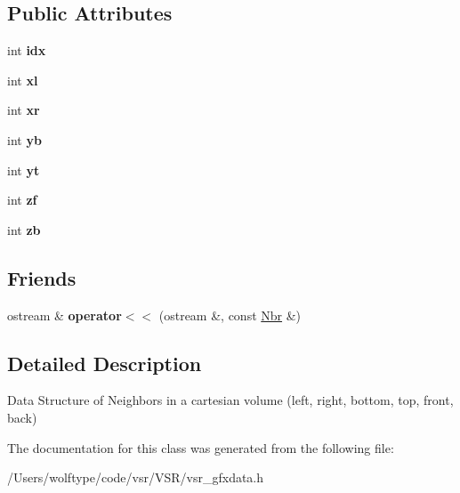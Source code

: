 \subsection*{Public Attributes}
\begin{DoxyCompactItemize}
\item 
\hypertarget{classvsr_1_1_nbr_a2165cceaa9f352492182a06ed5cf2310}{int {\bfseries idx}}\label{classvsr_1_1_nbr_a2165cceaa9f352492182a06ed5cf2310}

\item 
\hypertarget{classvsr_1_1_nbr_a57dfb82ec0e6517835e1175c307f2e57}{int {\bfseries xl}}\label{classvsr_1_1_nbr_a57dfb82ec0e6517835e1175c307f2e57}

\item 
\hypertarget{classvsr_1_1_nbr_a519671e397caf2ee4fd367e4ffd1daeb}{int {\bfseries xr}}\label{classvsr_1_1_nbr_a519671e397caf2ee4fd367e4ffd1daeb}

\item 
\hypertarget{classvsr_1_1_nbr_a9c1ac5ad69d47911c17c41f249821cb6}{int {\bfseries yb}}\label{classvsr_1_1_nbr_a9c1ac5ad69d47911c17c41f249821cb6}

\item 
\hypertarget{classvsr_1_1_nbr_afa8b3a06ef74c7b5ae197b3ea89f6134}{int {\bfseries yt}}\label{classvsr_1_1_nbr_afa8b3a06ef74c7b5ae197b3ea89f6134}

\item 
\hypertarget{classvsr_1_1_nbr_a71bb6704319c0ea450f40597d55e97e4}{int {\bfseries zf}}\label{classvsr_1_1_nbr_a71bb6704319c0ea450f40597d55e97e4}

\item 
\hypertarget{classvsr_1_1_nbr_a65d136ab5f4c8b2cf8e9df231b50638b}{int {\bfseries zb}}\label{classvsr_1_1_nbr_a65d136ab5f4c8b2cf8e9df231b50638b}

\end{DoxyCompactItemize}
\subsection*{Friends}
\begin{DoxyCompactItemize}
\item 
\hypertarget{classvsr_1_1_nbr_af087332407eff2eb5d68fd1044959d6f}{ostream \& {\bfseries operator$<$$<$} (ostream \&, const \hyperlink{classvsr_1_1_nbr}{Nbr} \&)}\label{classvsr_1_1_nbr_af087332407eff2eb5d68fd1044959d6f}

\end{DoxyCompactItemize}


\subsection{Detailed Description}
Data Structure of Neighbors in a cartesian volume (left, right, bottom, top, front, back) 

The documentation for this class was generated from the following file\-:\begin{DoxyCompactItemize}
\item 
/\-Users/wolftype/code/vsr/\-V\-S\-R/vsr\-\_\-gfxdata.\-h\end{DoxyCompactItemize}
